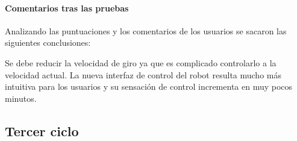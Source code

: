 \documentclass[twoside, 12pt]{epstfg}
\begin{document}
\paragraph{Comentarios tras las pruebas}

Analizando las puntuaciones y los comentarios de los usuarios se sacaron las siguientes conclusiones:

Se debe reducir la velocidad de giro ya que es complicado controlarlo a la velocidad actual.
La nueva interfaz de control del robot resulta mucho más intuitiva para los usuarios y su sensación de control incrementa en muy pocos minutos.

\subsection{Tercer ciclo}
\end{document}
